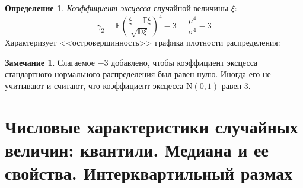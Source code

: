 \documentclass[oneside,final,14pt]{extreport}
\theoremstyle{plain}
\theoremstyle{definition}
\newtheorem*{defn}{Определение}
\newtheorem*{rmrk}{Замечание}
\theoremstyle{named}
\begin{document}
\begin{defn}
    {\it Коэффициент эксцесса} случайной величины $\xi$:
    \begin{equation*}
        \gamma_2=\mathbb{E}\left(\frac{\xi - \mathbb{E}\xi}{\sqrt{\mathbb{D}\xi}}\right)^4 - 3 = \frac{\mu^4}{\sigma^4} - 3
    \end{equation*}
    Характеризует <<островершинность>> графика плотности распределения:
    \medskip\hfill\break
    \begin{center}
    \end{center}
\end{defn}

\begin{rmrk}
    Слагаемое $-3$ добавлено, чтобы коэффициент эксцесса стандартного нормального распределения был равен нулю. Иногда его не учитывают и считают, что коэффициент эксцесса $\mathrm{N}(0,1)$ равен 3.
\end{rmrk}

\section {Числовые характеристики случайных величин: квантили. Медиана и ее свойства. Интерквартильный размах}
\end{document}
